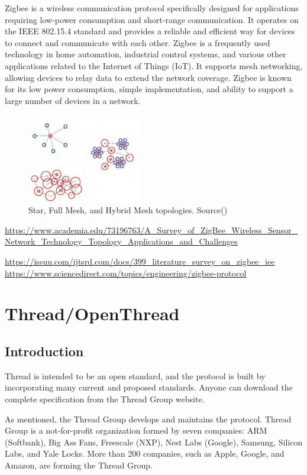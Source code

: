 Zigbee is a wireless communication protocol specifically designed for
applications requiring low-power consumption and short-range communication.
It operates on the IEEE 802.15.4 standard and provides a reliable and efficient way
for devices to connect and communicate with each other.
Zigbee is a frequently used technology in home automation, industrial control systems,
and various other applications related to the Internet of Things (IoT).
It supports mesh networking, allowing devices to relay data to extend the network
coverage. Zigbee is known for its low power consumption, simple implementation, and
ability to support a large number of devices in a network.

\begin{figure}[!ht]
    \centering
    \includegraphics[width=50mm, keepaspectratio]{figures/zigbee-topology-ug103-02-fundamentals-zigbee.jpg}
    \caption{Star, Full Mesh, and Hybrid Mesh topologies. Source(\cite{zigbee:silabs:ug103:2})}
\end{figure}

\url{https://www.academia.edu/73196763/A_Survey_of_ZigBee_Wireless_Sensor_Network_Technology_Topology_Applications_and_Challenges}

\url{https://issuu.com/ijtsrd.com/docs/399_literature_survey_on_zigbee_iee}
\url{https://www.sciencedirect.com/topics/engineering/zigbee-protocol}

\section{Thread/OpenThread}
\label{sec:ot}

\subsection{Introduction}
\label{sec:ot:intro}
Thread is intended to be an open standard, and the protocol is built by incorporating many
current and proposed standards.\cite{unwala:2018}
Anyone can download the complete specification from the Thread Group website. \cite{thread:130}

As mentioned, the Thread Group develops and maintains the protocol.
Thread Group is a not-for-profit organization formed by seven companies:
ARM (Softbank), Big Ass Fans, Freescale (NXP), Nest Labs (Google), Samsung, Silicon Labs, and Yale Locks.
More than 200 companies, such as Apple, Google, and Amazon, are forming the Thread Group. \cite{thread:members}

